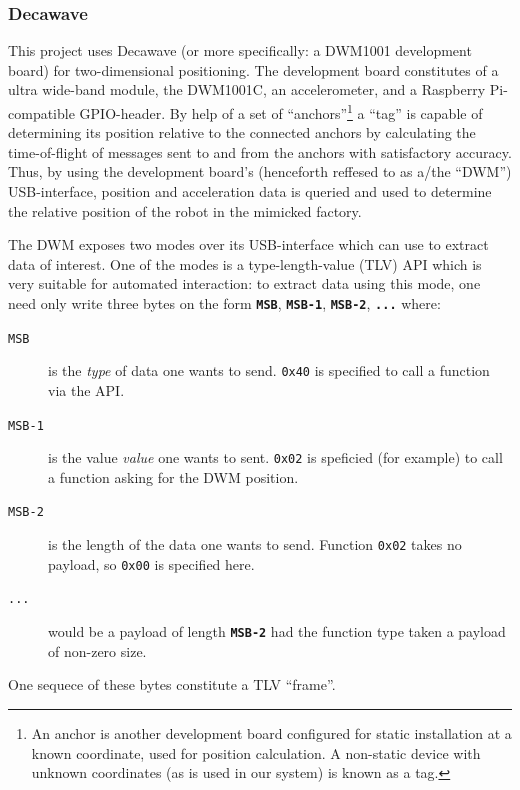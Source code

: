 \subsubsection{Decawave}
This project uses Decawave (or more specifically: a DWM1001 development board) for two-dimensional positioning.
The development board constitutes of a ultra wide-band module, the DWM1001C, an accelerometer,
and a Raspberry Pi-compatible GPIO-header.
By help of a set of ``anchors''\footnote{An anchor is another development board configured for static installation at a known coordinate, used for position calculation. A non-static device with unknown coordinates (as is used in our system) is known as a tag.} a ``tag'' is capable of determining its position relative to the connected anchors by calculating the time-of-flight of messages sent to and from the anchors with satisfactory accuracy.
Thus, by using the development board's (henceforth reffesed to as a/the ``DWM'') USB-interface,
position and acceleration data is queried and used to determine the relative position of the robot in the mimicked factory.

The DWM  exposes two modes over its USB-interface which can use to extract data of interest.
One of the modes is a type-length-value (TLV) API which is very suitable for automated interaction:
to extract data using this mode, one need only write three bytes on the form \texttt{\textbf{MSB}}, \texttt{\textbf{MSB-1}}, \texttt{\textbf{MSB-2}}, \texttt{\textbf{...}} where:
\begin{description}
\item[\texttt{MSB}] is the \textit{type} of data one wants to send. \texttt{0x40} is specified to call a function via the API.
\item[\texttt{MSB-1}] is the value \textit{value} one wants to sent. \texttt{0x02} is speficied (for example) to call a function asking for the DWM position.
\item[\texttt{MSB-2}] is the length of the data one wants to send. Function \texttt{0x02} takes no payload, so \texttt{0x00} is specified here.
\item[\texttt{...}] would be a payload of length \texttt{\textbf{MSB-2}} had the function type taken a payload of non-zero size.
\end{description}
One sequece of these bytes constitute a TLV ``frame''.

